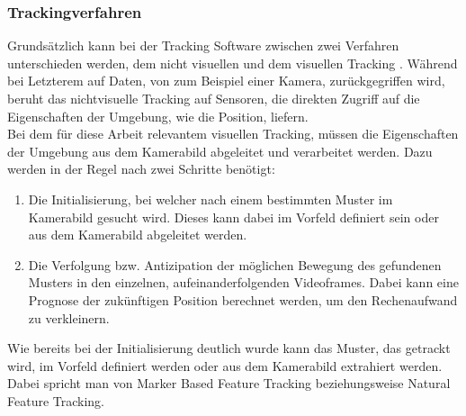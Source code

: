 \subsubsection{Trackingverfahren}\label{sec:Trackingverfahren}
Grundsätzlich kann bei der Tracking Software zwischen zwei Verfahren unterschieden werden, dem nicht visuellen und dem visuellen Tracking \citep[S. 26]{mehler-bicher:augmented-reality}. Während bei Letzterem auf Daten, von zum Beispiel einer Kamera, zurückgegriffen wird, beruht das nichtvisuelle Tracking auf Sensoren, die direkten Zugriff auf die Eigenschaften der Umgebung, wie die Position, liefern. \\
Bei dem für diese Arbeit relevantem visuellen Tracking, müssen die Eigenschaften der Umgebung aus dem Kamerabild abgeleitet und verarbeitet werden. Dazu werden in der Regel nach \citet[S. 26]{mehler-bicher:augmented-reality} zwei Schritte benötigt:
\begin{enumerate}
\item Die Initialisierung, bei welcher nach einem bestimmten Muster im Kamerabild gesucht wird. Dieses kann dabei im Vorfeld definiert sein oder aus dem Kamerabild abgeleitet werden.
\item Die Verfolgung bzw. Antizipation der möglichen Bewegung des gefundenen Musters in den einzelnen, aufeinanderfolgenden Videoframes. Dabei kann eine Prognose der zukünftigen Position berechnet werden, um den Rechenaufwand zu verkleinern.
\end{enumerate}
Wie bereits bei der Initialisierung deutlich wurde kann das Muster, das getrackt wird, im Vorfeld definiert werden oder aus dem Kamerabild extrahiert werden. Dabei spricht man von Marker Based Feature Tracking beziehungsweise Natural Feature Tracking. 

